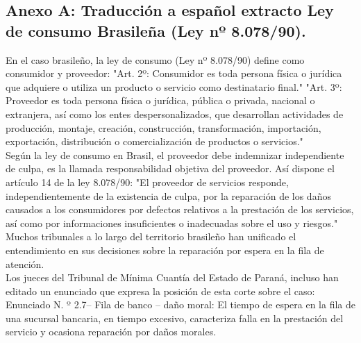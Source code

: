 \subsection*{Anexo A: Traducción a español extracto Ley de consumo Brasileña (Ley nº 8.078/90).}
\label{anexo-a}
En el caso brasileño, la ley de consumo (Ley nº 8.078/90) define como consumidor y proveedor:
"Art. 2º: Consumidor es toda persona física o jurídica que adquiere o utiliza un producto o servicio como destinatario final."
"Art. 3º: Proveedor es toda persona física o jurídica, pública o privada, nacional o extranjera, así como los entes despersonalizados, que desarrollan actividades de producción, montaje, creación, construcción, transformación, importación, exportación, distribución o comercialización de productos o servicios."\\

Según la ley de consumo en Brasil, el proveedor debe indemnizar independiente de culpa, es la llamada responsabilidad objetiva del proveedor. Así dispone el artículo 14 de la ley 8.078/90: "El proveedor de servicios responde, independientemente de la existencia de culpa, por la reparación de los daños causados a los consumidores por defectos relativos a la prestación de los servicios, así como por informaciones insuficientes o inadecuadas sobre el uso y riesgos."\\

Muchos tribunales a lo largo del territorio brasileño han unificado el entendimiento en sus decisiones sobre la reparación por espera en la fila de atención.\\

Los jueces del Tribunal de Mínima Cuantía del Estado de Paraná, incluso han editado un enunciado que expresa la posición de esta corte sobre el caso:
Enunciado N. º 2.7– Fila de banco – daño moral: El tiempo de espera en la fila de una sucursal bancaria, en tiempo excesivo, caracteriza falla en la prestación del servicio y ocasiona reparación por daños morales.\\

